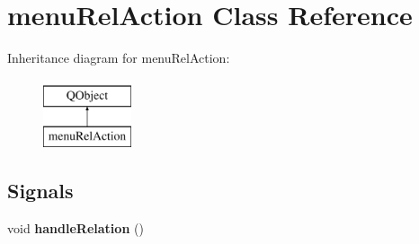 \hypertarget{classmenu_rel_action}{}\section{menu\+Rel\+Action Class Reference}
\label{classmenu_rel_action}
Inheritance diagram for menu\+Rel\+Action\+:\begin{figure}[H]
\begin{center}
\leavevmode
\includegraphics[height=2.000000cm]{classmenu_rel_action}
\end{center}
\end{figure}
\subsection*{Signals}
\begin{DoxyCompactItemize}
\item 
\mbox{\label{classmenu_rel_action_ab48d2afed38fa75b9d7908da3cf095dd}} 
void {\bfseries handle\+Relation} ()
\end{DoxyCompactItemize}
